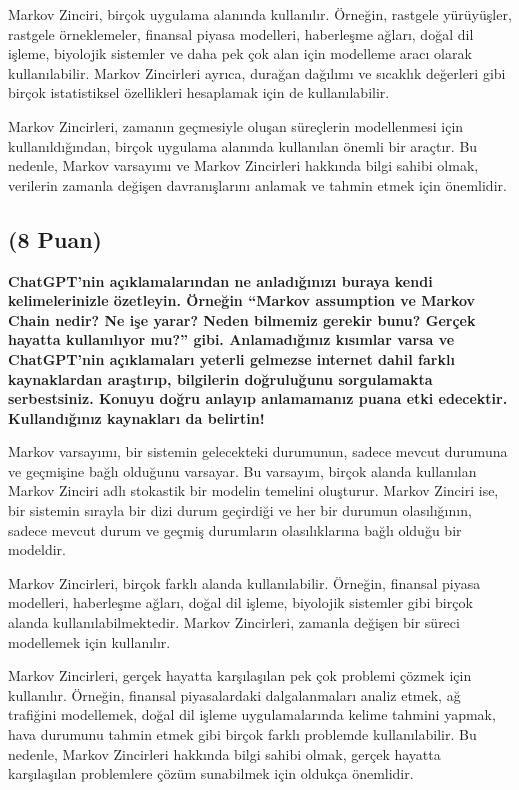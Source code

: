 \documentclass[11pt]{article}
\begin{document}
Markov Zinciri, birçok uygulama alanında kullanılır. Örneğin, rastgele yürüyüşler, rastgele örneklemeler, finansal piyasa modelleri, haberleşme ağları, doğal dil işleme, biyolojik sistemler ve daha pek çok alan için modelleme aracı olarak kullanılabilir. Markov Zincirleri ayrıca, durağan dağılımı ve sıcaklık değerleri gibi birçok istatistiksel özellikleri hesaplamak için de kullanılabilir.

Markov Zincirleri, zamanın geçmesiyle oluşan süreçlerin modellenmesi için kullanıldığından, birçok uygulama alanında kullanılan önemli bir araçtır. Bu nedenle, Markov varsayımı ve Markov Zincirleri hakkında bilgi sahibi olmak, verilerin zamanla değişen davranışlarını anlamak ve tahmin etmek için önemlidir.
\subsection{(8 Puan)} \textbf{ChatGPT’nin açıklamalarından ne anladığınızı buraya kendi kelimelerinizle özetleyin. Örneğin ``Markov assumption ve Markov Chain nedir? Ne işe yarar? Neden bilmemiz gerekir bunu? Gerçek hayatta kullanılıyor mu?'' gibi. Anlamadığınız kısımlar varsa ve ChatGPT’nin açıklamaları yeterli gelmezse internet dahil farklı kaynaklardan araştırıp, bilgilerin doğruluğunu sorgulamakta serbestsiniz. Konuyu doğru anlayıp anlamamanız puana etki edecektir. Kullandığınız kaynakları da belirtin!}

Markov varsayımı, bir sistemin gelecekteki durumunun, sadece mevcut durumuna ve geçmişine bağlı olduğunu varsayar. Bu varsayım, birçok alanda kullanılan Markov Zinciri adlı stokastik bir modelin temelini oluşturur. Markov Zinciri ise, bir sistemin sırayla bir dizi durum geçirdiği ve her bir durumun olasılığının, sadece mevcut durum ve geçmiş durumların olasılıklarına bağlı olduğu bir modeldir.

Markov Zincirleri, birçok farklı alanda kullanılabilir. Örneğin, finansal piyasa modelleri, haberleşme ağları, doğal dil işleme, biyolojik sistemler gibi birçok alanda kullanılabilmektedir. Markov Zincirleri, zamanla değişen bir süreci modellemek için kullanılır.

Markov Zincirleri, gerçek hayatta karşılaşılan pek çok problemi çözmek için kullanılır. Örneğin, finansal piyasalardaki dalgalanmaları analiz etmek, ağ trafiğini modellemek, doğal dil işleme uygulamalarında kelime tahmini yapmak, hava durumunu tahmin etmek gibi birçok farklı problemde kullanılabilir. Bu nedenle, Markov Zincirleri hakkında bilgi sahibi olmak, gerçek hayatta karşılaşılan problemlere çözüm sunabilmek için oldukça önemlidir.
\end{document}
